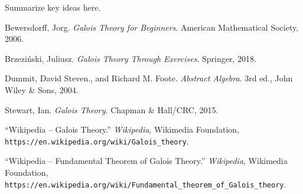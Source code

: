 \documentclass[11pt, a4paper, oneside]{article}
\theoremstyle{plain}
\theoremstyle{definition}
\theoremstyle{example}
\begin{document}
Summarize key ideas here.

\newpage
\begin{thebibliography}{9}

Bewersdorff, Jorg. \textit{Galois Theory for Beginners}. American Mathematical Society, 2006. 

Brzeziński, Juliusz. \textit{Galois Theory Through Exercises}. Springer, 2018. 

Dummit, David Steven., and Richard M. Foote. \textit{Abstract Algebra}. 3rd ed., John Wiley \& Sons, 2004.

Stewart, Ian. \textit{Galois Theory}. Chapman \& Hall/CRC, 2015.  

``Wikipedia -- Galois Theory.” \textit{Wikipedia}, Wikimedia Foundation,\\ \texttt{https://en.wikipedia.org/wiki/Galois\_theory}. 

``Wikipedia -- Fundamental Theorem of Galois Theory.” \textit{Wikipedia}, Wikimedia Foundation,\\ \texttt{https://en.wikipedia.org/wiki/Fundamental\_theorem\_of\_Galois\_theory}. 
\end{thebibliography}
\end{document}
